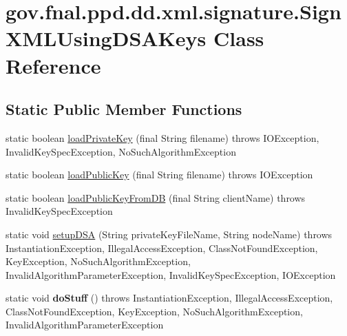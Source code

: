\hypertarget{classgov_1_1fnal_1_1ppd_1_1dd_1_1xml_1_1signature_1_1SignXMLUsingDSAKeys}{\section{gov.\-fnal.\-ppd.\-dd.\-xml.\-signature.\-Sign\-X\-M\-L\-Using\-D\-S\-A\-Keys Class Reference}
\label{classgov_1_1fnal_1_1ppd_1_1dd_1_1xml_1_1signature_1_1SignXMLUsingDSAKeys}
}
\subsection*{Static Public Member Functions}
\begin{DoxyCompactItemize}
\item 
static boolean \hyperlink{classgov_1_1fnal_1_1ppd_1_1dd_1_1xml_1_1signature_1_1SignXMLUsingDSAKeys_adf116a793a94389c6e5117b275e6e831}{load\-Private\-Key} (final String filename)  throws I\-O\-Exception, Invalid\-Key\-Spec\-Exception, No\-Such\-Algorithm\-Exception 
\item 
static boolean \hyperlink{classgov_1_1fnal_1_1ppd_1_1dd_1_1xml_1_1signature_1_1SignXMLUsingDSAKeys_af66415b0a2f20bf6149b9d0cb8c64e33}{load\-Public\-Key} (final String filename)  throws I\-O\-Exception 
\item 
static boolean \hyperlink{classgov_1_1fnal_1_1ppd_1_1dd_1_1xml_1_1signature_1_1SignXMLUsingDSAKeys_a309817e89eb4349b00220e86dd5576ec}{load\-Public\-Key\-From\-D\-B} (final String client\-Name)  throws Invalid\-Key\-Spec\-Exception 
\item 
static void \hyperlink{classgov_1_1fnal_1_1ppd_1_1dd_1_1xml_1_1signature_1_1SignXMLUsingDSAKeys_abb9261a032fa3b30e53b00cc00951a1f}{setup\-D\-S\-A} (String private\-Key\-File\-Name, String node\-Name)  throws Instantiation\-Exception, Illegal\-Access\-Exception, Class\-Not\-Found\-Exception, Key\-Exception, No\-Such\-Algorithm\-Exception, 			\-Invalid\-Algorithm\-Parameter\-Exception, Invalid\-Key\-Spec\-Exception, I\-O\-Exception 
\item 
\hypertarget{classgov_1_1fnal_1_1ppd_1_1dd_1_1xml_1_1signature_1_1SignXMLUsingDSAKeys_ad5903686ba075a760d9966c74eae5577}{static void {\bfseries do\-Stuff} ()  throws Instantiation\-Exception, Illegal\-Access\-Exception, Class\-Not\-Found\-Exception, Key\-Exception, 			\-No\-Such\-Algorithm\-Exception, Invalid\-Algorithm\-Parameter\-Exception }\label{classgov_1_1fnal_1_1ppd_1_1dd_1_1xml_1_1signature_1_1SignXMLUsingDSAKeys_ad5903686ba075a760d9966c74eae5577}


\end{DoxyCompactItemize}
